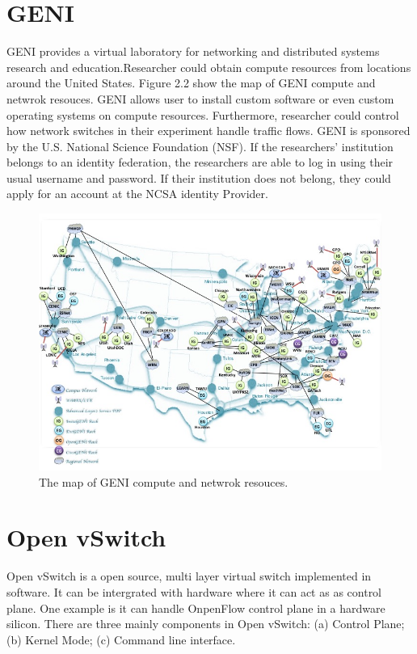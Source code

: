 \documentclass[a4paper,12pt]{report}
\begin{document}
\begin{large}
      \section{GENI}
      \qquad GENI provides a virtual laboratory for networking and 		 distributed systems research and education.Researcher could obtain compute resources from locations around the United States. Figure 2.2 show the map of GENI compute and netwrok resouces. GENI allows user to install custom software or even custom operating systems on compute resources. Furthermore, researcher could control how network switches in their experiment handle traffic flows. GENI is sponsored by the U.S. National Science Foundation (NSF). If the researchers' institution belongs to an identity federation, the researchers are able to log in using their usual username and password. If their institution does not belong, they could apply for an account at the NCSA identity Provider.
      \begin{figure}[h]
          \caption{The map of GENI compute and netwrok resouces.}
          \centering
            \includegraphics[width=1.0\textwidth]{GENI-MAP.jpg}
      \end{figure}
     \section{Open vSwitch}
     \qquad Open vSwitch is a open source, multi layer virtual switch implemented in software. It can be intergrated with hardware where it can act as as control plane. One example is it can handle OnpenFlow control plane in a hardware silicon. There are three mainly components in Open vSwitch: (a) Control Plane; (b) Kernel Mode; (c) Command line interface. 

\end{large}
\end{document}
